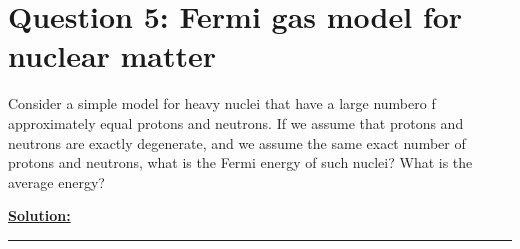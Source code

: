 \documentclass{article}
\begin{document}
\section*{Question 5: Fermi gas model for nuclear matter} 

Consider a simple model for heavy nuclei that have a large numbero f approximately equal protons and neutrons. If we assume that protons and neutrons are exactly degenerate, and we assume the same exact number of protons and neutrons, what is the Fermi energy of such nuclei? What is the average energy?

\vskip 0.5cm
\underline{\textbf{Solution:}} 


\vskip 0.5cm 
\hrule 
\vskip 0.5cm







\end{document}
